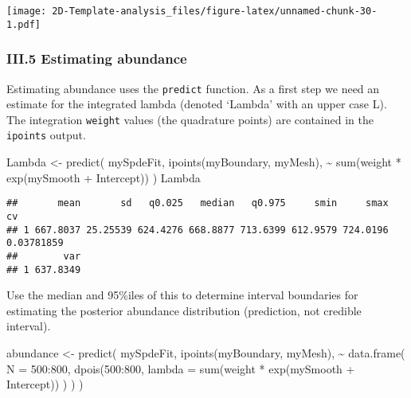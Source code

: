 \documentclass[
]{article}
\newenvironment{Shaded}{\begin{snugshade}}{\end{snugshade}}
\newcommand{\AttributeTok}[1]{\textcolor[rgb]{0.77,0.63,0.00}{#1}}
\newcommand{\DecValTok}[1]{\textcolor[rgb]{0.00,0.00,0.81}{#1}}
\newcommand{\FunctionTok}[1]{\textcolor[rgb]{0.00,0.00,0.00}{#1}}
\newcommand{\NormalTok}[1]{#1}
\newcommand{\OtherTok}[1]{\textcolor[rgb]{0.56,0.35,0.01}{#1}}
\newcommand{\SpecialCharTok}[1]{\textcolor[rgb]{0.00,0.00,0.00}{#1}}
\begin{document}
\texttt{[image: 2D-Template-analysis\_files/figure-latex/unnamed-chunk-30-1.pdf]}

\hypertarget{iii.5-estimating-abundance}{%
\subsubsection{III.5 Estimating
abundance}\label{iii.5-estimating-abundance}}

Estimating abundance uses the \texttt{predict} function. As a first step
we need an estimate for the integrated lambda (denoted `Lambda' with an
upper case L). The integration \texttt{weight} values (the quadrature
points) are contained in the \texttt{ipoints} output.

\begin{Shaded}
\begin{Highlighting}[]
\NormalTok{Lambda }\OtherTok{\textless{}{-}} \FunctionTok{predict}\NormalTok{(}
\NormalTok{  mySpdeFit,}
  \FunctionTok{ipoints}\NormalTok{(myBoundary, myMesh),}
  \SpecialCharTok{\textasciitilde{}} \FunctionTok{sum}\NormalTok{(weight }\SpecialCharTok{*} \FunctionTok{exp}\NormalTok{(mySmooth }\SpecialCharTok{+}\NormalTok{ Intercept))}
\NormalTok{)}
\NormalTok{Lambda}
\end{Highlighting}
\end{Shaded}

\begin{verbatim}
##       mean       sd   q0.025   median   q0.975     smin     smax         cv
## 1 667.8037 25.25539 624.4276 668.8877 713.6399 612.9579 724.0196 0.03781859
##        var
## 1 637.8349
\end{verbatim}

Use the median and 95\%iles of this to determine interval boundaries for
estimating the posterior abundance distribution (prediction, not
credible interval).

\begin{Shaded}
\begin{Highlighting}[]
\NormalTok{abundance }\OtherTok{\textless{}{-}} \FunctionTok{predict}\NormalTok{(}
\NormalTok{  mySpdeFit, }\FunctionTok{ipoints}\NormalTok{(myBoundary, myMesh),}
  \SpecialCharTok{\textasciitilde{}} \FunctionTok{data.frame}\NormalTok{(}
    \AttributeTok{N =} \DecValTok{500}\SpecialCharTok{:}\DecValTok{800}\NormalTok{,}
    \FunctionTok{dpois}\NormalTok{(}\DecValTok{500}\SpecialCharTok{:}\DecValTok{800}\NormalTok{,}
      \AttributeTok{lambda =} \FunctionTok{sum}\NormalTok{(weight }\SpecialCharTok{*} \FunctionTok{exp}\NormalTok{(mySmooth }\SpecialCharTok{+}\NormalTok{ Intercept))}
\NormalTok{    )}
\NormalTok{  )}
\NormalTok{)}
\end{Highlighting}
\end{Shaded}
\end{document}
